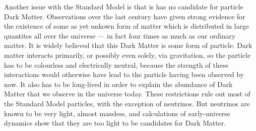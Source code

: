 \documentclass[twoside,english]{uiofysmaster}
\begin{document}
Another issue with the Standard Model is that is has no candidate for particle Dark Matter. Observations over the last century have given strong evidence for the existence of some as yet unkown form of matter which is distributed in large quantites all over the universe --- in fact four times as much as our ordinary matter. It is widely believed that this Dark Matter is some form of particle. Dark matter interacts primarily, or possibly even solely, via gravitation, so the particle has to be colourless and electrically neutral, because the strength of these interactions would otherwise have lead to the particle having been observed by now. It also has to be long-lived in order to explain the abundance of Dark Matter that we observe in the universe today. These restrictions rule out most of the Standard Model particles, with the exception of neutrinos. But neutrinos are known to be very light, almost massless, and calculations of early-universe dynamics show that they are too light to be candidates for Dark Matter. 
\end{document}
